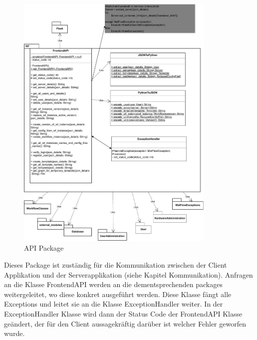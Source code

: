 \subsubsection{}
\begin{figure}[h!]
    \includegraphics[width=0.85\textwidth]{res/api.drawio.pdf}
    \caption{API Package}
\end{figure}
\FloatBarrier
Dieses Package ist zuständig für die Kommunikation zwischen der Client Applikation und der Serverapplikation (siehe Kapitel 
Kommunikation). Anfragen an die Klasse FrontendAPI werden an die dementsprechenden packages weitergeleitet, wo diese konkret 
ausgeführt werden. Diese Klasse fängt alle Exceptions und leitet sie an die Klasse ExceptionHandler weiter.
In der ExceptionHandler Klasse wird dann der Status Code der FrontendAPI Klasse geändert, der für den Client aussagekräftig
darüber ist welcher Fehler geworfen wurde.


\newpage


